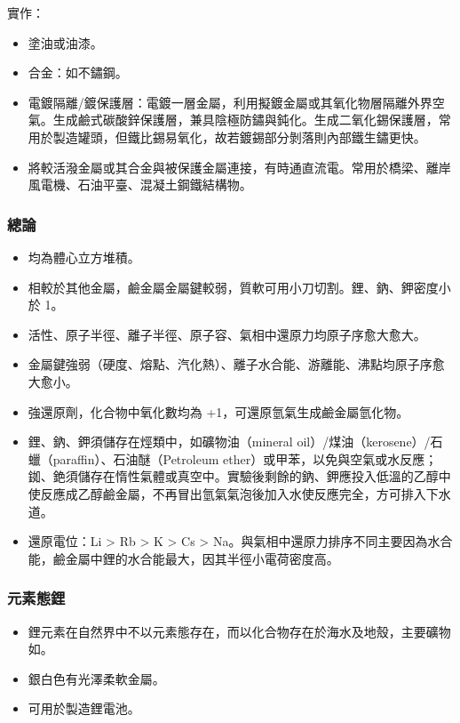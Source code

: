 \documentclass[a4paper,12pt]{report}
\begin{document}
\begin{itemize}
\begin{itemize}
\begin{itemize}
\end{itemize}
實作：
\begin{itemize}
\item 塗油或油漆。
\item 合金：如不鏽鋼。
\item 電鍍隔離/鍍保護層：電鍍一層金屬，利用擬鍍金屬或其氧化物層隔離外界空氣。生成鹼式碳酸鋅保護層，兼具陰極防鏽與鈍化。生成二氧化錫保護層，常用於製造罐頭，但鐵比錫易氧化，故若鍍錫部分剝落則內部鐵生鏽更快。
\item 將較活潑金屬或其合金與被保護金屬連接，有時通直流電。常用於橋梁、離岸風電機、石油平臺、混凝土鋼鐵結構物。
\end{itemize}
\subsubsection{總論}
\begin{itemize}
\item 均為體心立方堆積。
\item 相較於其他金屬，鹼金屬金屬鍵較弱，質軟可用小刀切割。鋰、鈉、鉀密度小於 1。
\item 活性、原子半徑、離子半徑、原子容、氣相中還原力均原子序愈大愈大。
\item 金屬鍵強弱（硬度、熔點、汽化熱）、離子水合能、游離能、沸點均原子序愈大愈小。
\item 強還原劑，化合物中氧化數均為 +1，可還原氫氣生成鹼金屬氫化物。
\item 鋰、鈉、鉀須儲存在烴類中，如礦物油（mineral oil）/煤油（kerosene）/石蠟（paraffin）、石油醚（Petroleum ether）或甲苯，以免與空氣或水反應；銣、銫須儲存在惰性氣體或真空中。實驗後剩餘的鈉、鉀應投入低溫的乙醇中使反應成乙醇鹼金屬，不再冒出氫氣氣泡後加入水使反應完全，方可排入下水道。
\item 還原電位：Li > Rb > K > Cs > Na。與氣相中還原力排序不同主要因為水合能，鹼金屬中鋰的水合能最大，因其半徑小電荷密度高。
\end{itemize}
\subsubsection{元素態鋰}
\begin{itemize}
\item 鋰元素在自然界中不以元素態存在，而以化合物存在於海水及地殼，主要礦物如。
\item 銀白色有光澤柔軟金屬。
\item 可用於製造鋰電池。
\end{itemize}

\end{itemize}
\end{itemize}
\end{document}
